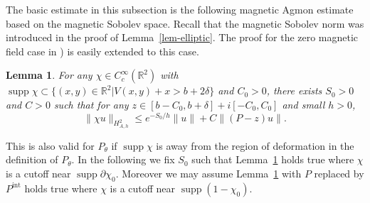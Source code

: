 \documentclass{article}
\theoremstyle{plain}
\newtheorem{lemma}[prop]{Lemma}
\theoremstyle{definition}
\theoremstyle{remark}
\newcommand{\RR}{\mathbb{R}}
\newcommand{\Cinf}{C^{\infty}}
\newcommand{\supp}{\mathop{\mathrm{supp}}}
\newcommand{\RE}{\mathrm{Re}\,}
\newcommand{\IM}{\mathrm{Im}\,}
\begin{document}
The basic estimate in this subsection is the following magnetic Agmon estimate 
based on the magnetic Sobolev space. 
Recall that the magnetic Sobolev norm was introduced in 
the proof of Lemma~\ref{lem-elliptic}. 
The proof for the zero magnetic field case in \cite[Chapter~7]{Z}) is easily extended to this case.   
\begin{lemma}\label{lemma-Agmon}
For any $\chi\in \Cinf_c(\RR^2)$ with
$\supp \chi \subset \{(x, y)\in \RR^2|V(x, y)+x>b+2\delta\}$ and $C_0>0$, 
there exists $S_0>0$ and $C>0$ such that for 
any $z\in [b-C_0, b+\delta]+i[-C_0,C_0]$ and small $h>0$, 
\[ \|\chi u\|_{H_{A, h}^2} \le e^{-S_0/h}\|u\|+C\|(P-z)u\|. \]
\end{lemma}
This is also valid for $P_{\theta}$ if $\supp \chi$ is away from the region of deformation 
in the definition of $P_{\theta}$. 
In the following we fix $S_0$ such that  
Lemma~\ref{lemma-Agmon} holds true where $\chi$ is a cutoff near $\supp \partial \chi_0$. 
Moreover we may assume Lemma~\ref{lemma-Agmon} with $P$ replaced by $P^{\mathrm{int}}$ holds true  
where $\chi$ is a cutoff near $\supp (1-\chi_0)$.
\end{document}
